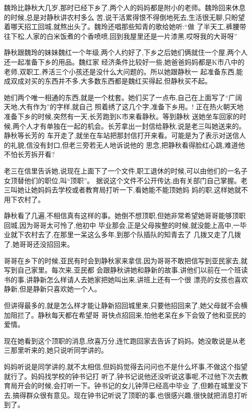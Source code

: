 ﻿\documentclass[12pt]{article}
\begin{document}
魏玲比静秋大几岁,那时已经下乡了,两个人的妈妈都是附小的老师。魏玲回来休息的时候,总是对静秋讲农村多么
苦,说干活累得恨不得倒地死去,生活很无聊,只盼望着哪天招工回城,就熬出头了。魏玲还唱那些知青的歌给她听:``做
了半天工,裤腰带往下松,人家的白米饭煮的个香喷喷,回到我屋里还是一片漆黑,哎呀我的大哥呀\myrule ''

静秋跟魏玲的妹妹魏红一个年级,两个人约好了,下乡之后她们俩就住一个屋,两个人还一起准备下乡的用品。魏红家
经济条件比较好一些,她爸爸妈妈都是K市八中的老师,双职工,养活三个小孩还是没什么大问题的。所以她跟静秋一
起准备东西,能成双成对买的东西并不多,大多数东西都是魏红买得起,但静秋买不起。

她们两个唯一相通的东西,就是一个枕套。她们买了一点布,自己在上面写了``广阔天地,大有作为''的字样,就自己
照着绣了这几个字,准备下乡用。! 正在热火朝天地准备下乡的时候,突然有一天,长芳跑到K市来看静秋。等到静秋
送她坐车回家的时候,两个人才有单独在一起的机会。长芳拿出一封信给静秋,说是老三叫她送来的。静秋等长芳的
车开走了,就坐在车站把那封信打开来看。可能是为了表示对送信人的礼貌,信没有封口,但老三旁若无人地诉说他的
思念,把静秋看得脸红心跳,难道他不怕长芳拆开看?

老三在信里告诉她,说现在上面下了一个文件,职工退休的时候,可以由他们的一名子女顶替他们的职位,叫``顶职''。
据说这个文件不公开传达,由有关部门自己掌握。老三叫她让她妈妈去学校或者教育局打听一下,看她能不能顶她妈
妈的职,这样她就不用下农村了。

静秋看了几遍,不相信真有这样的事。她倒不想顶职,但她非常希望她哥哥能够顶职回城,因为哥哥太可怜了,他初中
毕业那会,正是父母挨整的时候,就没能上高中,一毕业就下农村去了,在那里一呆这么多年,到那个队插队的知青去了
几拨又走了几拨了,她哥哥还没招回来。

哥哥在乡下的时候,亚民有时会到静秋家来拿信,因为哥哥不敢把信写到亚民家去,就写到自己家里。每次来,亚民都
会跟静秋讲她和静新的故事,讲他们以前在一个班读书的事,讲静新怎么样请人去她家把她叫出来,讲班上还有一个很
漂亮的女孩也喜欢静新,但是静新只喜欢她一个人。

但讲得最多的,就是怎么样才能让静新招回城里来,只要他招回来了,她父母就不会横加阻拦了。静秋每天都在希望哥
哥快点招回来,怕他老呆在乡下会毁了他和亚民的爱情。

现在她看到这个顶职的消息,欣喜万分,连忙跑回家去告诉了妈妈。她没敢说是从老三那里听来的,她只说听同学讲的。

妈妈听说是同学讲的,就不太相信,但妈妈觉得去问问也不是什么坏事,不做这个指望就行了。妈妈找学校的钟书记打
听了,钟书记说他还没听说这事呢,不过他下次去教育局开会的时候,会打听一下。钟书记的女儿钟萍已经高中毕业
了,但赖在城里没下去,搞得群众很有意见。现在钟书记听说了顶职的事,也很感兴趣,很快就把消息打听到了。
\end{document}
